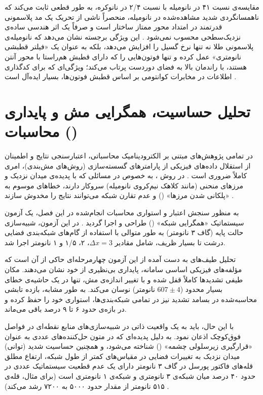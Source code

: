 \documentclass[12pt,a4paper]{report}
\begin{document}
مقایسه‌ی نسبت ۴۱ در نانومیله با نسبت ۲/۴ در نانوکره، به طور قطعی ثابت می‌کند که ناهمسانگردی شدید مشاهده‌شده در نانومیله، منحصراً ناشی از تحریک یک مد پلاسمونی قدرتمند در امتداد محور ممتاز ساختار است و صرفاً یک اثر هندسی ساده‌ی نزدیک‌سطحی محسوب نمی‌شود \cite{maier,giannini}. این ویژگی برجسته نشان می‌دهد که نانومیله‌ی پلاسمونی طلا نه تنها نرخ گسیل را افزایش می‌دهد، بلکه به عنوان یک «فیلتر قطبشی نانومتری» عمل کرده و تنها فوتون‌هایی را که دارای قطبش هم‌راستا با محور آنتن هستند، با راندمان بالا به فضای دوردست پرتاب می‌کند؛ ویژگی‌ای که برای کدگذاری اطلاعات در مخابرات کوانتومی بر اساس قطبش فوتون‌ها، بسیار ایده‌آل است \cite{novotny,maier}.

\section{تحلیل حساسیت، همگرایی مش و پایداری محاسبات ()}
در تمامی پژوهش‌های مبتنی بر الکترودینامیک محاسباتی، اعتبارسنجی نتایج و اطمینان از استقلال داده‌های فیزیکی از پارامترهای گسسته‌سازی (روش‌های مش‌بندی)، امری کاملاً ضروری است \cite{taflove}. در روش ، به خصوص در مسائلی که با پدیده‌ی میدان نزدیک و مرزهای منحنی (مانند کلاهک نیم‌کروی نانومیله) سروکار دارند، خطاهای موسوم به «پلکانی شدن مرزها» () و عدم تقارن شبکه می‌توانند نتایج را مخدوش سازند \cite{taflove}.

به منظور سنجش اعتبار و استواری محاسبات انجام‌شده در این فصل، یک آزمون سیستماتیک «همگرایی شبکه» () طراحی و اجرا گردید \cite{taflove}. در این آزمون، شبیه‌سازی حالت پایه (گاف ۳ نانومتر) به طور متوالی با استفاده از گام‌های شبکه‌بندی فضایی درشت تا بسیار ظریف، شامل مقادیر $\Delta x=3$، ۲، ۱/۵ و ۱ نانومتر اجرا شد.

تحلیل طیف‌های به دست آمده از این آزمون چهارمرحله‌ای حاکی از آن است که مؤلفه‌های فیزیکی اساسی سامانه، پایداری بی‌نظیری از خود نشان می‌دهند. مکان طیفی تشدیدها کاملاً قفل شده و با تغییر اندازه‌ی مش، تنها در یک حاشیه‌ی خطای بسیار محدود ($607\pm4$ نانومتر) نوسان می‌کند. به طور مشابه، بازده تابشی محاسبه‌شده در بسامد تشدید نیز در تمامی شبکه‌بندی‌ها، استواری خود را حفظ کرده و در بازه‌ی حدود ۶ تا ۹ درصد باقی می‌ماند.

با این حال، باید به یک واقعیت ذاتی در شبیه‌سازی‌های  منابع نقطه‌ای در فواصل فوق‌کوچک اذعان نمود. به دلیل پدیده‌ای که در متون حل‌کننده‌های عددی به عنوان «قرارگیری زیرسلولی چشمه» () شناخته می‌شود، و همچنین حساسیت شدید (توانی) میدان نزدیک به تغییرات فضایی در مقیاس‌های کمتر از طول شبکه، ارتفاع مطلق قله‌های فاکتور پورسل در گاف ۳ نانومتر دارای یک عدم قطعیت سیستماتیک عددی در حدود ۴۰ درصد میان شبکه‌ی ۳ نانومتری و شبکه‌ی ۱ نانومتری است (برای مثال، قله‌ی ۵۱۵ نانومتر از مقدار حدود ۵۰۰۰ به ۷۲۰۰ رشد می‌کند) \cite{taflove,novotny}.
\end{document}
